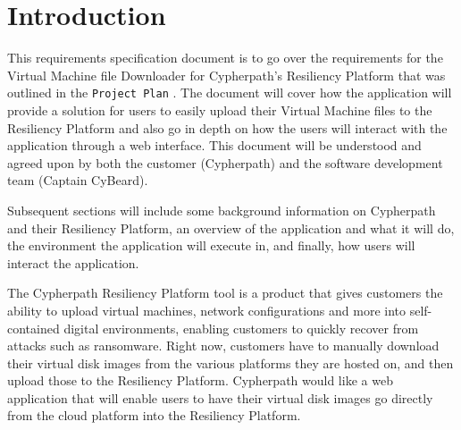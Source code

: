 \documentclass{article}
\begin{document}
    


    \tableofcontents
    \newpage
    \listoffigures


    \newpage
    \begin{versionhistory}
    \end{versionhistory}
    \newpage


    \section{Introduction}
    This requirements specification document is to go over the requirements for the Virtual Machine file Downloader for Cypherpath's Resiliency Platform that was outlined in the
    \texttt{Project Plan} \cite{projectplan}.
    The document will cover how the application will provide a solution for users to easily upload their Virtual Machine files to the Resiliency Platform and also
    go in depth on how the users will interact with the application through a web interface. This document will be understood and agreed
    upon by both the customer (Cypherpath) and the software development team (Captain CyBeard).

    Subsequent sections will include some background information on Cypherpath and their Resiliency Platform, an overview of the application and what it
    will do, the environment the application will execute in, and finally, how users will interact the application.

	The Cypherpath Resiliency Platform tool is a product that gives customers the ability to upload virtual machines, network configurations and more into 
    self-contained digital environments, enabling customers to quickly recover from attacks such as ransomware. Right now, customers have to manually download their virtual disk images from
    the various platforms they are hosted on, and then upload those to the Resiliency Platform. Cypherpath would like a web application that will enable users to have their virtual disk images go
    directly from the cloud platform into the Resiliency Platform.
	
\end{document}

